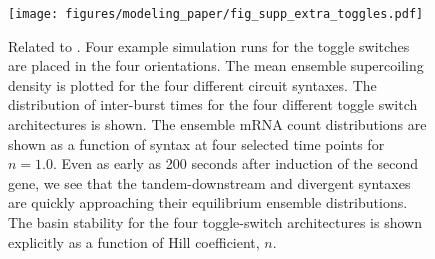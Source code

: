 \documentclass[11pt]{article} %
\begin{document}
\begin{figure}[htbp]
    \centering
    {\texttt{[image: figures/modeling\_paper/fig\_supp\_extra\_toggles.pdf]}
    \label{fig:supp_toggles_run_examples}
    \label{fig:supp_toggles_mean_sc_density}
    \label{fig:supp_toggles_interburst_time}
    \label{fig:supp:n1_toggle_distributions}
    \label{fig:supp:toggles_hill_n_sweep}
    }
    \caption{Related to .
         Four example simulation runs for the toggle switches are placed in the four orientations. 
         The mean ensemble supercoiling density is plotted for the four different circuit syntaxes.
         The distribution of inter-burst times for the four different toggle switch architectures is shown.
         The ensemble mRNA count distributions are shown as a function of syntax at four selected time points for \(n = 1.0\). Even as early as 200 seconds after induction of the second gene, we see that the tandem-downstream and divergent syntaxes are quickly approaching their equilibrium ensemble distributions.
         The basin stability for the four toggle-switch architectures is shown explicitly as a function of Hill coefficient, \(n\).
    }
\end{figure}
\end{document}
